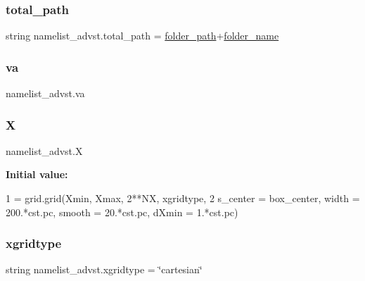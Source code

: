 \subsubsection{\texorpdfstring{total\+\_\+path}{total\_path}}
{\footnotesize\ttfamily string namelist\+\_\+advst.\+total\+\_\+path = \hyperlink{namespacenamelist__advst_ac4af9d0b4fb1c8e072a43b5ee91eb5e5}{folder\+\_\+path}+\hyperlink{namespacenamelist__advst_aed61e4f60a73b3b17c11d94f03046285}{folder\+\_\+name}}

\mbox{\label{namespacenamelist__advst_a000c7a3539ade9de809d1c7467e2a0cf}} 
\subsubsection{\texorpdfstring{va}{va}}
{\footnotesize\ttfamily namelist\+\_\+advst.\+va}

\mbox{\label{namespacenamelist__advst_a2f115dd04213a05c5f5bcb9196106295}} 
\subsubsection{\texorpdfstring{X}{X}}
{\footnotesize\ttfamily namelist\+\_\+advst.\+X}

{\bfseries Initial value\+:}
\begin{DoxyCode}
1 =  grid.grid(Xmin, Xmax, 2**NX, xgridtype, 
2               s\_center = box\_center, width = 200.*cst.pc, smooth = 20.*cst.pc, dXmin = 1.*cst.pc)
\end{DoxyCode}
\mbox{\label{namespacenamelist__advst_a4949957746aba42b8d0c598a4b3d0c85}} 
\subsubsection{\texorpdfstring{xgridtype}{xgridtype}}
{\footnotesize\ttfamily string namelist\+\_\+advst.\+xgridtype = \char`\"{}cartesian\char`\"{}}

\mbox{\label{namespacenamelist__advst_ae96d3730340f884849fe28b3cf4d944c}} 
